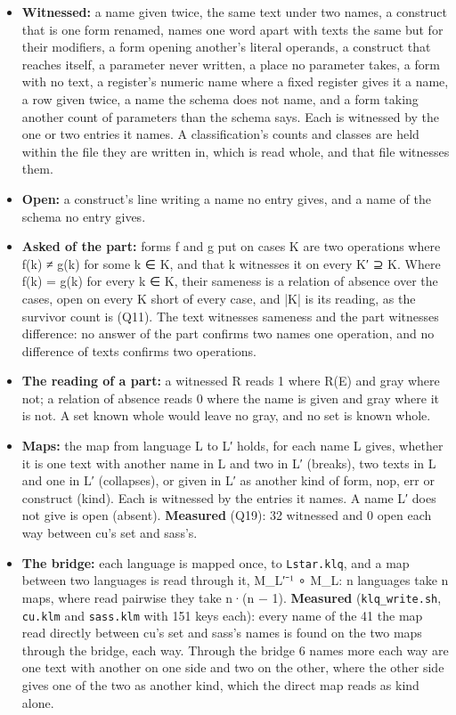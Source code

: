 \begin{itemize}
\item \textbf{Witnessed:} a name given twice, the same text under two names, a construct that is one form renamed, names one word apart with texts the same but for their modifiers, a form opening another's literal operands, a construct that reaches itself, a parameter never written, a place no parameter takes, a form with no text, a register's numeric name where a fixed register gives it a name, a row given twice, a name the schema does not name, and a form taking another count of parameters than the schema says. Each is witnessed by the one or two entries it names. A classification's counts and classes are held within the file they are written in, which is read whole, and that file witnesses them.
\item \textbf{Open:} a construct's line writing a name no entry gives, and a name of the schema no entry gives.
\item \textbf{Asked of the part:} forms f and g put on cases K are two operations where f(k) ≠ g(k) for some k ∈ K, and that k witnesses it on every K′ ⊇ K. Where f(k) = g(k) for every k ∈ K, their sameness is a relation of absence over the cases, open on every K short of every case, and |K| is its reading, as the survivor count is (Q11). The text witnesses sameness and the part witnesses difference: no answer of the part confirms two names one operation, and no difference of texts confirms two operations.
\item \textbf{The reading of a part:} a witnessed R reads 1 where R(E) and gray where not; a relation of absence reads 0 where the name is given and gray where it is not. A set known whole would leave no gray, and no set is known whole.
\item \textbf{Maps:} the map from language L to L′ holds, for each name L gives, whether it is one text with another name in L and two in L′ (breaks), two texts in L and one in L′ (collapses), or given in L′ as another kind of form, nop, err or construct (kind). Each is witnessed by the entries it names. A name L′ does not give is open (absent). \textbf{Measured} (Q19): 32 witnessed and 0 open each way between cu's set and sass's.
\item \textbf{The bridge:} each language is mapped once, to \texttt{Lstar.\allowbreak{}klq}, and a map between two languages is read through it, M\_\allowbreak{}L′⁻¹ ∘ M\_\allowbreak{}L: n languages take n maps, where read pairwise they take n·(n − 1). \textbf{Measured} (\texttt{klq\_\allowbreak{}write.\allowbreak{}sh}, \texttt{cu.\allowbreak{}klm} and \texttt{sass.\allowbreak{}klm} with 151 keys each): every name of the 41 the map read directly between cu's set and sass's names is found on the two maps through the bridge, each way. Through the bridge 6 names more each way are one text with another on one side and two on the other, where the other side gives one of the two as another kind, which the direct map reads as kind alone.
\end{itemize}

